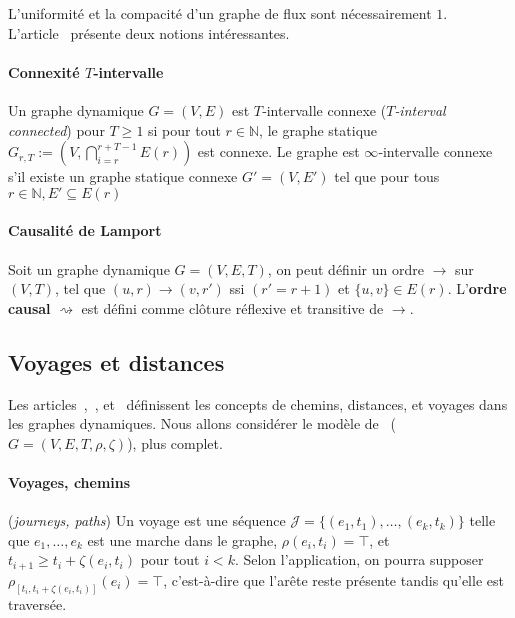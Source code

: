 \documentclass[12pt,a4paper]{article}
\begin{document}
L'uniformité et la compacité d'un graphe de flux sont nécessairement
\(1\).\\

L'article~\cite{kuhn2010distributed} présente deux notions
intéressantes.

\paragraph{Connexité \(T\)‑intervalle}
Un graphe dynamique \(G = (V, E)\) est \(T\)‑intervalle connexe
(\textit{\(T\)‑interval connected}) pour \(T \geq 1\) si pour tout
\(r \in \mathbb{N}\), le graphe statique
\(G_{r,T} := \left(V, \bigcap_{i=r}^{r+T-1} E(r)\right)\) est
connexe. Le graphe est \(\infty\)‑intervalle connexe s'il existe un
graphe statique connexe \(G' = (V, E')\) tel que pour tous
\(r \in \mathbb{N}, E' \subseteq E(r)\)

\paragraph{Causalité de Lamport}
Soit un graphe dynamique \(G = (V, E, T)\), on peut définir un ordre
\(\rightarrow\) sur \((V, T)\), tel que
\((u, r) \rightarrow (v, r')\) ssi \((r' = r + 1)\) et
\(\{u, v\} \in E(r)\). L'\textbf{ordre causal} \(\rightsquigarrow\)
est défini comme clôture réflexive et transitive de \(\rightarrow\).

\subsection{Voyages et distances}

Les articles~\cite{xuan2003computing},~\cite{casteigts2012time},
et~\cite{latapy2017stream} définissent les concepts de chemins,
distances, et voyages dans les graphes dynamiques. Nous allons
considérer le modèle de~\cite{casteigts2012time}
(\(G = (V, E, T, \rho, \zeta)\)), plus complet.

\paragraph{Voyages, chemins} (\textit{journeys, paths}) Un voyage est
une séquence \(\mathcal{J} = \{(e_1, t_1), \dots, (e_k, t_k)\}\) telle
que \({e_1, \dots, e_k}\) est une marche dans le graphe,
\(\rho(e_i, t_i) = \top\), et \(t_{i+1} \geq t_i + \zeta(e_i, t_i)\)
pour tout \(i < k\). Selon l'application, on pourra supposer
\(\rho_{[t_i, t_i + \zeta(e_i, t_i)]}(e_i) = \top\), c'est-à-dire que
l'arête reste présente tandis qu'elle est traversée.
\end{document}
